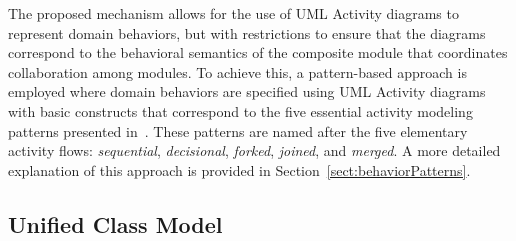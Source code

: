 The proposed mechanism allows for the use of UML Activity diagrams to represent domain behaviors, but with restrictions to ensure that the diagrams correspond to the behavioral semantics of the composite module that coordinates collaboration among modules. To achieve this, a pattern-based approach is employed where domain behaviors are specified using UML Activity diagrams with basic constructs that correspond to the five essential activity modeling patterns presented in~\cite{le_domain_2018}. These patterns are named after the five elementary activity flows: \textit{sequential}, \textit{decisional}, \textit{forked}, \textit{joined}, and \textit{merged}. A more detailed explanation of this approach is provided in Section~\ref{sect:behaviorPatterns}.

\subsection{Unified Class Model}
\label{subsect:unifiedModel}

